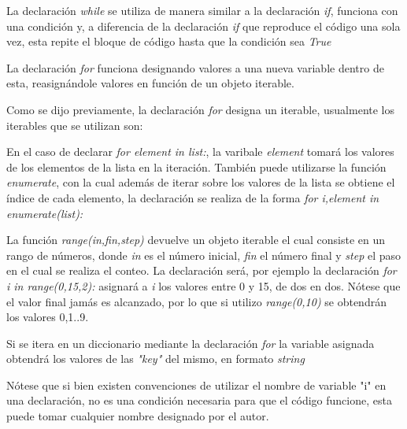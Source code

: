\documentclass[10pt,a4paper]{article}
\begin{document}
\begin{description}[
align=right,
labelindent=1cm,
labelsep=0.5cm,
itemindent=0cm]
	\item [while] La declaración \emph{while} se utiliza de manera similar a la declaración \emph{if}, funciona con una condición y, a diferencia de la declaración \emph{if} que reproduce el código una sola vez, esta repite el bloque de código hasta que la condición sea \emph{True}
	\item [for] La declaración \emph{for} funciona designando valores a una nueva variable dentro de esta, reasignándole valores en función de un objeto iterable.
\end{description}

\noindent Como se dijo previamente, la declaración \emph{for} designa un iterable, usualmente los iterables que se utilizan son:

\begin{description}[labelsep=0.5cm, itemindent=0cm]

	\item [list]
		En el caso de declarar \emph{for element in list:}, la varibale \emph{element} tomará los valores de los elementos de la lista en la iteración. También puede utilizarse la función \emph{enumerate}, con la cual además de iterar sobre los valores de la lista se obtiene el índice de cada elemento, la declaración se realiza de la forma \emph{for i,element in enumerate(list):}  
	\item [range(in,fin,step)]
		La función \emph{range(in,fin,step)} devuelve un objeto iterable el cual consiste en un rango de números, donde \emph{in} es el número inicial, \emph{fin} el número final y \emph{step} el paso en el cual se realiza el conteo. La declaración será, por ejemplo la declaración \emph{for i in range(0,15,2):} asignará a \emph{i} los valores entre 0 y 15, de dos en dos. Nótese que el valor final jamás es alcanzado, por lo que si utilizo \emph{range(0,10)} se obtendrán los valores 0,1..9.
	\item [dictionary]
		Si se itera en un diccionario mediante la declaración \emph{for} la variable asignada obtendrá los valores de las \emph{"key"} del mismo, en formato \emph{string}

\end{description}

\noindent Nótese que si bien existen convenciones de utilizar el nombre de variable "i" en una declaración, no es una condición necesaria para que el código funcione, esta puede tomar cualquier nombre designado por el autor.
\end{document}
